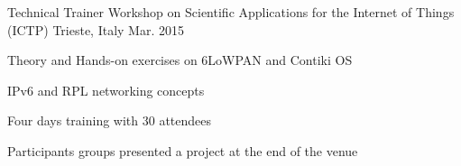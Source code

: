 \begin{cventries}
  \cventry
    {Technical Trainer} %
    {Workshop on Scientific Applications for the Internet of Things (ICTP)} %
    {Trieste, Italy} %
    {Mar. 2015} %
    {
      \begin{cvitems} %
        \item {Theory and Hands-on exercises on 6LoWPAN and Contiki OS}
        \item {IPv6 and RPL networking concepts}
        \item {Four days training with 30 attendees}
        \item {Participants groups presented a project at the end of the venue }
      \end{cvitems}
    }

  \cventry %
    {} %
    {} %
    {} %
    {} %
    {}

\end{cventries}
